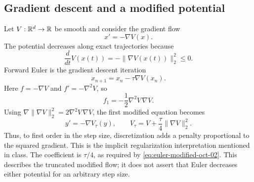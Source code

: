 \subsection{Gradient descent and a modified potential}

Let \(V:\mathbb{R}^d\to\mathbb{R}\) be smooth and consider the gradient flow
\[
 x'=-\nabla V(x).
\]
The potential decreases along exact trajectories because
\[
 \frac{d}{dt}V(x(t))=-\|\nabla V(x(t))\|_2^2\leq0.
\]
Forward Euler is the gradient descent iteration
\[
 x_{n+1}=x_n-\tau\nabla V(x_n).
\]
Here \(f=-\nabla V\) and \(f'=-\nabla^2V\), so
\[
 f_1=-\frac12\nabla^2V\,\nabla V.
\]
Using \(\nabla\|\nabla V\|_2^2=2\nabla^2V\,\nabla V\), the
first modified equation becomes
\begin{equation}\label{eq:modified-potential-oct-02}
 \boxed{y'=-\nabla V_\tau(y),\qquad
 V_\tau=V+\frac\tau4\|\nabla V\|_2^2.}
\end{equation}
Thus, to first order in the step size, discretization adds a penalty
proportional to the squared gradient. This is the implicit
regularization interpretation mentioned in class. The coefficient is
\(\tau/4\), as required by \eqref{eq:euler-modified-oct-02}.
This describes the truncated modified flow; it does not assert that
Euler decreases either potential for an arbitrary step size.
